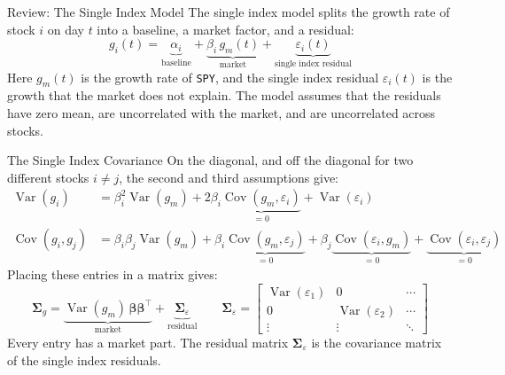 \documentclass[aspectratio=169,11pt]{beamer}
\begin{document}
\begin{frame}{Review: The Single Index Model}
  The single index model splits the growth rate of stock $i$ on day $t$ into a baseline, a market
  factor, and a residual:
  \begin{equation*}
    g_{i}(t)=\underbrace{\alpha_{i}}_{\textstyle\text{baseline}}+\underbrace{\beta_{i}\,g_{m}(t)}_{\textstyle\text{market}}+\underbrace{\varepsilon_{i}(t)}_{\textstyle\text{single index residual}}
  \end{equation*}
  Here $g_m(t)$ is the growth rate of \texttt{SPY}, and the single index residual $\varepsilon_i(t)$
  is the growth that the market does not explain. The model assumes that the residuals have zero
  mean, are uncorrelated with the market, and are uncorrelated across stocks.
\end{frame}

\begin{frame}{The Single Index Covariance}
  On the diagonal, and off the diagonal for two different stocks $i\neq j$, the second and third
  assumptions give:
  \begin{align*}
    \operatorname{Var}(g_{i}) &= \beta_{i}^{2}\operatorname{Var}(g_{m})+2\beta_{i}\underbrace{\operatorname{Cov}(g_{m},\varepsilon_{i})}_{=0}+\operatorname{Var}(\varepsilon_{i})\\
    \operatorname{Cov}(g_{i},g_{j}) &= \beta_{i}\beta_{j}\operatorname{Var}(g_{m})+\beta_{i}\underbrace{\operatorname{Cov}(g_{m},\varepsilon_{j})}_{=0}+\beta_{j}\underbrace{\operatorname{Cov}(\varepsilon_{i},g_{m})}_{=0}+\underbrace{\operatorname{Cov}(\varepsilon_{i},\varepsilon_{j})}_{=0}
  \end{align*}
  Placing these entries in a matrix gives:
  \begin{equation*}
    \boxed{\symbf{\Sigma}_{g}=\underbrace{\operatorname{Var}(g_{m})\,\boldsymbol{\beta}\boldsymbol{\beta}^{\top}}_{\textstyle\text{market}}+\underbrace{\symbf{\Sigma}_{\varepsilon}}_{\textstyle\text{residual}}}
    \qquad
    \symbf{\Sigma}_{\varepsilon}=\begin{bmatrix}\operatorname{Var}(\varepsilon_{1}) & 0 & \cdots\\ 0 & \operatorname{Var}(\varepsilon_{2}) & \cdots\\ \vdots & \vdots & \ddots\end{bmatrix}
  \end{equation*}
  Every entry has a market part. The residual matrix $\symbf{\Sigma}_{\varepsilon}$ is the covariance
  matrix of the single index residuals.
\end{frame}
\end{document}
